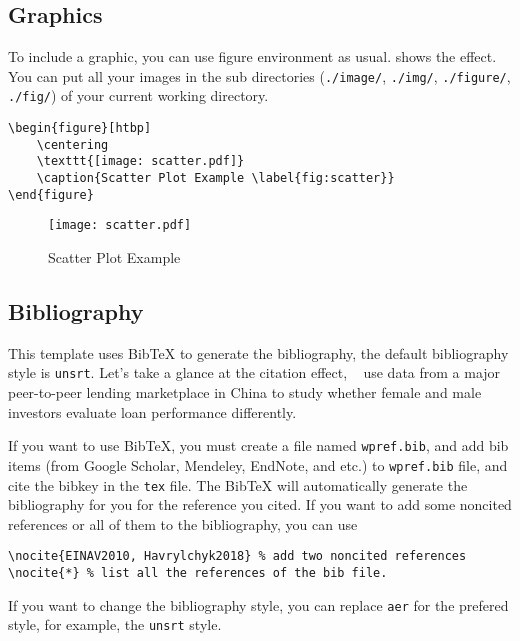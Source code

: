 \documentclass[11pt]{elegantpaper}
\begin{document}
\subsection{Graphics}
To include a graphic, you can use figure environment as usual.  shows the effect. You can put all your images in the sub directories (\lstinline{./image/}, \lstinline{./img/}, \lstinline{./figure/}, \lstinline{./fig/}) of your current working directory.

\begin{lstlisting}
\begin{figure}[htbp]
	\centering
	\texttt{[image: scatter.pdf]}
	\caption{Scatter Plot Example \label{fig:scatter}}
\end{figure}
\end{lstlisting}
\begin{figure}[htbp]
	\centering
	\texttt{[image: scatter.pdf]}
	\caption{Scatter Plot Example \label{fig:scatter}}
\end{figure}

\subsection{Bibliography}
This template uses Bib\TeX{} to generate the bibliography, the default bibliography style is \lstinline{unsrt}. Let's take a glance at the citation effect, ~\cite{en3} use data from a major peer-to-peer lending marketplace in China to study whether female and male investors evaluate loan performance differently. 

If you want to use Bib\TeX{}, you must create a file named \lstinline{wpref.bib}, and add bib items (from Google Scholar, Mendeley, EndNote, and etc.) to \lstinline{wpref.bib} file, and cite the bibkey in the \lstinline{tex} file. The Bib\TeX{} will automatically generate the bibliography for you for the reference you cited. If you want to add some noncited references or all of them to the bibliography,  you can use 

\begin{lstlisting}
\nocite{EINAV2010, Havrylchyk2018} % add two noncited references 
\nocite{*} % list all the references of the bib file.
\end{lstlisting}

If you want to change the bibliography style, you can replace \lstinline{aer} for the prefered style, for example, the \lstinline{unsrt} style.

\begin{lstlisting}

\end{lstlisting}
\end{document}
